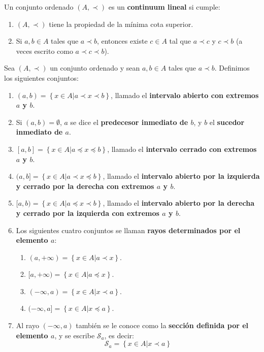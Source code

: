 \documentclass[12pt]{report}
\theoremstyle{largebreak}
\begin{document}
    \begin{mydef}
        Un conjunto ordenado $(A,\prec)$ es un \textbf{continuum lineal} si cumple:
        \begin{enumerate}
            \item $(A,\prec)$ tiene la propiedad de la mínima cota superior.
            \item Si $a,b\in A$ tales que $a\prec b$, entonces existe $c\in A$ tal que $a\prec c$ y $c\prec b$ (a veces escrito como $a\prec c\prec b$).
        \end{enumerate}
    \end{mydef}

    \begin{mydef}
        Sea $(A,\prec)$ un conjunto ordenado y sean $a,b\in A$ tales que $a\prec b$. Definimos los siguientes conjuntos:
        \begin{enumerate}
            \item $(a,b)=\left\{x\in A\Big|a\prec x\prec b \right\}$, llamado el \textbf{intervalo abierto con extremos $a$ y $b$}.
            \item Si $(a,b)=\emptyset$, $a$ se dice el \textbf{predecesor inmediato de $b$}, y $b$ el \textbf{sucedor inmediato de $a$}.
            \item $[a,b]=\left\{x\in A\Big|a\preceq x\preceq b \right\}$, llamado el \textbf{intervalo cerrado con extremos $a$ y $b$}.
            \item $(a,b]=\left\{x\in A\Big|a\prec x\preceq b \right\}$, llamado el \textbf{intervalo abierto por la izquierda y cerrado por la derecha con extremos $a$ y $b$}.
            \item $[a,b)=\left\{x\in A\Big|a\preceq x\prec b \right\}$, llamado el \textbf{intervalo abierto por la derecha y cerrado por la izquierda con extremos $a$ y $b$}.
            \item Los siguientes cuatro conjuntos se llaman \textbf{rayos determinados por el elemento $a$}:
            \begin{enumerate}
                \item $(a,+\infty)=\left\{x\in A\Big|a\prec x \right\}$.
                \item $[a,+\infty)=\left\{x\in A\Big|a\preceq x \right\}$.
                \item $(-\infty,a)=\left\{x\in A\Big|x\prec a \right\}$.
                \item $(-\infty, a]=\left\{x\in A\Big|x\preceq a \right\}$.
            \end{enumerate}
            \item Al rayo $(-\infty, a)$ también se le conoce como la \textbf{sección definida por el elemento $a$}, y se escribe $\mathcal{S}_a$, es decir:
            \begin{equation*}
                \mathcal{S}_a=\left\{x\in A\Big|x\prec a \right\}
            \end{equation*}
        \end{enumerate}
    \end{mydef}
\end{document}

